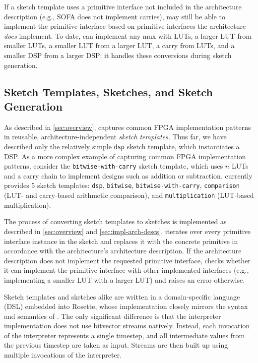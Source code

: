 If a sketch template uses a primitive interface
  not included in the architecture description
  (e.g., SOFA does not implement carries),
  \lr may still be able to implement the primitive interface
  based on primitive interfaces
  the architecture \textit{does} implement.
To date, \lr can implement any mux
  with LUTs, 
  a larger LUT from  smaller LUTs,
  a smaller LUT from a larger LUT,
  a carry from LUTs,
  and a smaller DSP from a larger DSP;
  it handles these conversions during sketch generation.


\subsection{Sketch Templates, Sketches, and Sketch Generation}

\label{sec:impl-sketch-templates}

As described in \cref{sec:overview},
  \lr 
  captures common FPGA implementation patterns
  in reusable, architecture-independent
  \textit{sketch templates.}
Thus far, we have described only 
  the relatively simple
  \texttt{dsp} sketch template,
  which instantiates a DSP.
As a more complex example
  of capturing common FPGA implementation patterns,
  consider
  the \texttt{bitwise-with-carry}
  sketch template, which
  uses $n$ LUTs and a carry chain
  to implement designs such as 
  addition or subtraction.
\lr currently provides 5 sketch templates: 
  \texttt{dsp},
  \texttt{bitwise}, \texttt{bitwise-with-carry},
  \texttt{comparison} (LUT- and carry-based arithmetic comparison), 
  and
  \texttt{multiplication} (LUT-based multiplication).
 
The process of converting sketch templates
  to sketches
  is implemented as described in
  \cref{sec:overview}
  and \cref{sec:impl-arch-descs}.
\lr iterates over every
  primitive interface instance
  in the sketch
  and replaces it with
  the concrete primitive
  in accordance with
  the architecture's 
  architecture description.
If the architecture description
  does not implement the requested
  primitive interface,
  \lr checks whether it can implement
  the primitive interface with other
  implemented interfaces
  (e.g., implementing a smaller LUT with
  a larger LUT)
  and raises an error otherwise.

Sketch templates and sketches alike 
  are written in a domain-specific language (DSL)
  embedded into Rosette,
  whose implementation closely mirrors the syntax
  and semantics of \UberLang. 
The only significant difference is that
  the interpreter implementation
  does not use bitvector streams natively.
Instead, each invocation of the interpreter
  represents a single timestep,
  and all intermediate values from the previous timestep
  are taken as input.
Streams are then built up
  using multiple invocations of the interpreter.

